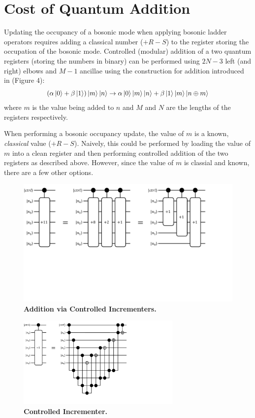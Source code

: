 \section{Cost of Quantum Addition}
\label{sec:addition}

Updating the occupancy of a bosonic mode when applying bosonic ladder operators requires adding a classical number ($+ R - S$) to the register storing the occupation of the bosonic mode.
Controlled (modular) addition of a two quantum registers (storing the numbers in binary) can be performed using $2N - 3$ left (and right) elbows and $M - 1$ ancillae using the construction for addition introduced in \cite{gidney2018halving} (Figure 4):
\begin{equation}
    (\alpha \ket{0} + \beta \ket{1})\ket{m}\ket{n} \rightarrow \alpha \ket{0}\ket{m}\ket{n} + \beta \ket{1}\ket{m}\ket{n \oplus m}
\end{equation}
where $m$ is the value being added to $n$ and $M$ and $N$ are the lengths of the registers respectively.

When performing a bosonic occupancy update, the value of $m$ is a known, \textit{classical} value ($+ R - S$).
Naively, this could be performed by loading the value of $m$ into a clean register and then performing controlled addition of the two registers as described above.
However, since the value of $m$ is classial and known, there are a few other options.

\begin{figure}
    \centering
    \includegraphics[width=16cm]{figures/addition-via-incrementers.pdf}
    \caption{
        \textbf{Addition via Controlled Incrementers.} 
    }
    \label{fig:addition-via-incrementers}
\end{figure}

\begin{figure}
    \centering
    \includegraphics[width=8cm]{figures/incrementer.pdf}
    \caption{
        \textbf{Controlled Incrementer.} 
    }
    \label{fig:incrementer}
\end{figure}


